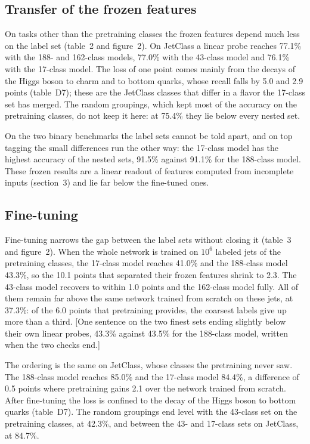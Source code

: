 \documentclass[11pt,a4paper]{article}
\newcommand{\bn}[1]{\textcolor{blue!70!black}{#1}}
\newcommand{\chk}[1]{\textcolor{red!70!black}{#1}}
\begin{document}
\subsection{Transfer of the frozen features}

On tasks other than the pretraining classes the frozen features depend much less on the label set
(table~2 and figure~2).
On JetClass a linear probe reaches \bn{77.1\%} with the 188- and 162-class models, \bn{77.0\%}
with the 43-class model and \bn{76.1\%} with the 17-class model.
The loss of one point comes mainly from the decays of the Higgs boson to charm and to bottom
quarks, whose recall falls by \bn{5.0} and \bn{2.9} points (table~D7); these are the JetClass
classes that differ in a flavor the 17-class set has merged.
The random groupings, which kept most of the accuracy on the pretraining classes, do not keep it
here: at \bn{75.4\%} they lie below every nested set.

On the two binary benchmarks the label sets cannot be told apart, and on top tagging the small
differences run the other way: the 17-class model has the highest accuracy of the nested sets,
\bn{91.5\%} against \bn{91.1\%} for the 188-class model.
These frozen results are a linear readout of features computed from incomplete inputs
(section~3) and lie far below the fine-tuned ones.

\subsection{Fine-tuning}

Fine-tuning narrows the gap between the label sets without closing it (table~3 and figure~2).
When the whole network is trained on $10^6$ labeled jets of the pretraining classes, the 17-class
model reaches \bn{41.0\%} and the 188-class model \bn{43.3\%}, so the \bn{10.1} points that
separated their frozen features shrink to \bn{2.3}.
The 43-class model recovers to within \bn{1.0} points and the 162-class model fully.
All of them remain far above the same network trained from scratch on these jets, at
\bn{37.3\%}: of the \bn{6.0} points that pretraining provides, the coarsest labels give up more
than a third.
\chk{[One sentence on the two finest sets ending slightly below their own linear probes,
\bn{43.3\%} against \bn{43.5\%} for the 188-class model, written when the two checks end.]}

The ordering is the same on JetClass, whose classes the pretraining never saw.
The 188-class model reaches \bn{85.0\%} and the 17-class model \bn{84.4\%}, a difference of
\bn{0.5} points where pretraining gains \bn{2.1} over the network trained from scratch.
After fine-tuning the loss is confined to the decay of the Higgs boson to bottom quarks
(table~D7).
The random groupings end level with the 43-class set on the pretraining classes, at \bn{42.3\%},
and between the 43- and 17-class sets on JetClass, at \bn{84.7\%}.
\end{document}
